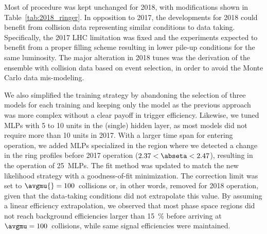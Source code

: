 Most of procedure was kept unchanged for 2018, with modifications shown in
Table~\ref{tab:2018_ringer}. In opposition to 2017, the developments for 2018
could benefit from collision data representing similar conditions to data taking.
Specifically, the 2017 LHC limitation was
fixed and the experiments expected to benefit from a proper filling scheme
resulting in lower pile-up conditions for the same luminosity. The major
alteration in 2018 tunes was the derivation of the \rnn{} ensemble with
collision data based on \Zee{} \tnp{} event selection, in order to avoid the
Monte Carlo data mis-modeling.

We also simplified the training strategy by abandoning the selection of three
models for each training and keeping only the \spmax{} model as the previous approach was more complex without a clear
payoff in trigger efficiency.
Likewise, we tuned MLPs with 5 to 10 units in the (single) hidden layer, as most models did not require
more than 10 units in 2017. With a larger time span for entering operation, we
added MLPs specialized in the region where we detected a change in the ring
profiles before 2017 operation ($2.37<\abseta<2.47$), resulting in the operation of
\SI{25}{MLPs}. The fit method was updated to match the new likelihood strategy with a
goodness-of-fit minimization. The correction limit was set to
$\avgmu{}=100$~collisions or, in other words, removed for 2018 operation, given
that the data-taking conditions did not extrapolate this value. By assuming a
linear efficiency extrapolation,%
we observed that most phase space regions did not reach background efficiencies
larger than \SI{15}{\%} before arriving at $\avgmu=100$~collisions, while same
signal efficiencies were maintained.



